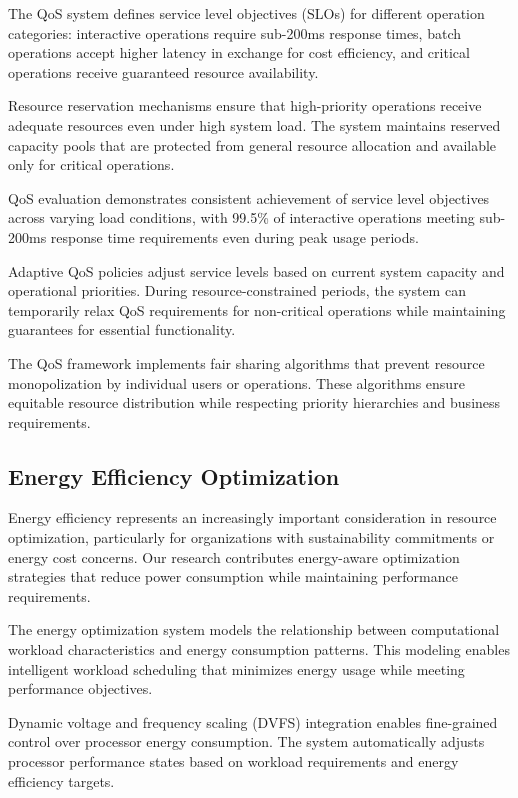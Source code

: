 The QoS system defines service level objectives (SLOs) for different operation categories: interactive operations require sub-200ms response times, batch operations accept higher latency in exchange for cost efficiency, and critical operations receive guaranteed resource availability.

Resource reservation mechanisms ensure that high-priority operations receive adequate resources even under high system load. The system maintains reserved capacity pools that are protected from general resource allocation and available only for critical operations.

\begin{successbox}
QoS evaluation demonstrates consistent achievement of service level objectives across varying load conditions, with 99.5\% of interactive operations meeting sub-200ms response time requirements even during peak usage periods.
\end{successbox}

Adaptive QoS policies adjust service levels based on current system capacity and operational priorities. During resource-constrained periods, the system can temporarily relax QoS requirements for non-critical operations while maintaining guarantees for essential functionality.

The QoS framework implements fair sharing algorithms that prevent resource monopolization by individual users or operations. These algorithms ensure equitable resource distribution while respecting priority hierarchies and business requirements.

\subsection*{Energy Efficiency Optimization}

Energy efficiency represents an increasingly important consideration in resource optimization, particularly for organizations with sustainability commitments or energy cost concerns. Our research contributes energy-aware optimization strategies that reduce power consumption while maintaining performance requirements.

The energy optimization system models the relationship between computational workload characteristics and energy consumption patterns. This modeling enables intelligent workload scheduling that minimizes energy usage while meeting performance objectives.

Dynamic voltage and frequency scaling (DVFS) integration enables fine-grained control over processor energy consumption. The system automatically adjusts processor performance states based on workload requirements and energy efficiency targets.

